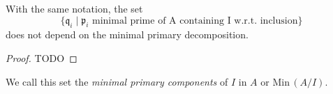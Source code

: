 \begin{theorem}
    With the same notation, the set \[\{\mathfrak{q}_i \mid \mathfrak{p}_i \text{ minimal prime of A containing I w.r.t. inclusion}\}\]
    does not depend on the minimal primary decomposition.

    \begin{proof}
        TODO %
    \end{proof}
\end{theorem}

\begin{defn}
    We call this set the \emph{minimal primary components} of $I$ in $A$ or $\text{Min}\,(A/I)$.
\end{defn}

